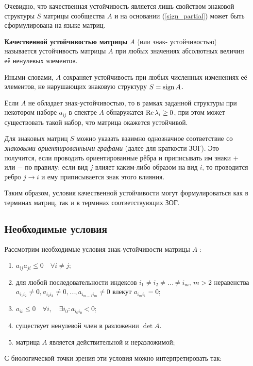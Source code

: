     Очевидно, что качественная устойчивость является лишь свойством знаковой структуры \(S\) матрицы сообщества \(A\) и на основании (\ref{sign_partial}) может быть сформулирована на языке матриц.
    \begin{definition}
        \textbf{Качественной устойчивостью матрицы} \(A\) (или знак- \hspace{-2pt}устойчивостью) называется устойчивость матрицы \(A\) при любых значениях абсолютных величин её ненулевых элементов.
    \end{definition}
    Иными словами, \(A\) сохраняет устойчивость при любых численных изменениях её элементов, не нарушающих знаковую структуру \(S = \operatorname{sign} A\).

    Если \(A\) не обладает знак-устойчивостью, то в рамках заданной структуры при некотором наборе \({a_{ij}}\) в спектре \(A\) обнаружатся \(\operatorname{Re} \lambda_i \geq 0\), при этом может существовать такой набор, что матрица окажется устойчивой.

    Для знаковых матриц \(S\) можно указать взаимно однозначное соответствие со \textit{знаковыми ориентированными графами} (далее для краткости ЗОГ). Это получится, если проводить ориентированные рёбра и приписывать им знаки \(+\) или \(-\) по правилу: если вид \(j\) влияет каким-либо образом на вид \(i\), то проводится ребро \(j \to i\) и ему приписывается знак этого влияния.

    Таким образом, условия качественной устойчивости могут формулироваться как в терминах матриц, так и в терминах соответствующих ЗОГ.

\subsection{Необходимые условия}

    Рассмотрим необходимые условия знак-устойчивости матрицы \(A\) \cite{quirk_rupert}:
    \begin{enumerate}
        \item \(a_{ij} a_{ji} \leq 0 \quad \forall i \neq j\); \label{sign_nes_1}
        \item для любой последовательности индексов \(i_1 \neq i_2 \neq \dots \neq i_m \), \(m > 2\) неравенства \(a_{i_1 i_2} \neq 0, a_{i_2 i_3} \neq 0, \dots, a_{i_{m-1} i_m} \neq 0\) влекут \(a_{i_m i_1} = 0\); \label{sign_nes_2}
        \item \(a_{ii} \leq 0 \quad \forall i, \quad \exists i_0 : a_{i_0 i_0} < 0\); \label{sign_nes_3}
        \item существует ненулевой член в разложении \(\det A\). \label{sign_nes_4}
        \item матрица \(A\) является действительной и неразложимой; \label{sign_nes_neraz}
    \end{enumerate}
    С биологической точки зрения эти условия можно интерпретировать так:
    
